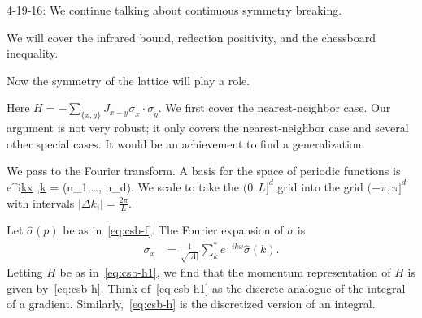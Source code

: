 
{\color{blue}4-19-16: We continue talking about continuous symmetry breaking.}

We will cover the infrared bound, reflection positivity, and the chessboard inequality.

Now the symmetry of the lattice will play a role.

Here $H=-\sum_{\{x,y\}} J_{x-y} \underline{\sigma}_x\cdot \underline{\sigma}_y$. We first cover the nearest-neighbor case. Our argument is not very robust; it only covers the nearest-neighbor case and several other special cases. It would be an achievement to find a generalization.

We pass to the Fourier transform. A basis for the space of periodic functions is 
\be
{}e^{i\underline{k}\cdot \underline{x}} ,\qquad \underline{k} =  (n_1,\ldots, n_d).
\ee
We scale to take the $(0,L]^d$ grid into the grid $(-\pi,\pi]^d$ with intervals $|\Delta k_i| = \frac{2\pi}{L}$. 

Let $\widehat{\sigma}(p)$ be as in~\eqref{eq:csb-f}. The Fourier expansion of $\sigma$ is
\begin{align}
\sigma_x &= \frac{1}{\sqrt{|\Lambda|}} \sum_k^* e^{-ikx}\widehat{\sigma}(k).
\end{align}
Letting $H$ be as in~\eqref{eq:csb-h1}, we find that the momentum representation of $H$ is given by~\eqref{eq:csb-h}.
Think of~\eqref{eq:csb-h1} as the discrete analogue of the integral of a gradient. Similarly,~\eqref{eq:csb-h} is the discretized version of an integral.

